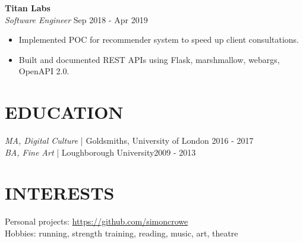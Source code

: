 \documentclass[line,margin]{res}
\begin{document}
\begin{resume}
	        \textbf{Titan Labs} \\
                {\sl Software Engineer} \hfill         Sep 2018 - Apr 2019 \\
                  \begin{itemize} \itemsep -2pt %
                  \item Implemented POC for recommender system to speed up client consultations.
                  \item Built and documented REST APIs using Flask, marshmallow, webargs, OpenAPI 2.0.
                  \end{itemize}
 
 
\section{EDUCATION} {\sl MA, Digital Culture} | Goldsmiths, University of London \hfill 2016 - 2017 \\
                    {\sl BA, Fine Art} | Loughborough University\hfill 2009 - 2013
 
 
\section{INTERESTS} Personal projects: \url{https://github.com/simoncrowe} \\
                    Hobbies: running, strength training, reading, music, art, theatre
 

\end{resume}
\end{document}
